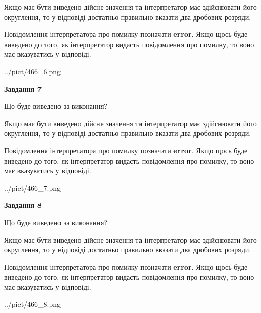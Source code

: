 \documentclass[12pt, ukrainian]{article}
\begin{document}
{\begin {Large}
Якщо має бути виведено дійсне значення та інтерпретатор має здійснювати його округлення, 
то у відповіді достатньо правильно вказати два дробових розряди.

Повідомлення інтерпретатора про помилку позначати \textbf{error}.
Якщо щось буде виведено до того, як інтерпретатор видасть повідомлення про помилку, 
то воно має вказуватись у відповіді. \par

\begin{center}
	{../pict/466_6.png}
\end{center}
\newpage

{\begin {center}\textbf{Завдання 7}\end {center}}\par
Що буде виведено за виконання? \par

Якщо має бути виведено дійсне значення та інтерпретатор має здійснювати його округлення, 
то у відповіді достатньо правильно вказати два дробових розряди.

Повідомлення інтерпретатора про помилку позначати \textbf{error}.
Якщо щось буде виведено до того, як інтерпретатор видасть повідомлення про помилку, 
то воно має вказуватись у відповіді. \par

\begin{center}
	{../pict/466_7.png}
\end{center}
\newpage

{\begin {center}\textbf{Завдання 8}\end {center}}\par
Що буде виведено за виконання? \par

Якщо має бути виведено дійсне значення та інтерпретатор має здійснювати його округлення, 
то у відповіді достатньо правильно вказати два дробових розряди.

Повідомлення інтерпретатора про помилку позначати \textbf{error}.
Якщо щось буде виведено до того, як інтерпретатор видасть повідомлення про помилку, 
то воно має вказуватись у відповіді. \par

\begin{center}
	{../pict/466_8.png}
\end{center}
\newpage


\end{Large}}
\end{document}

